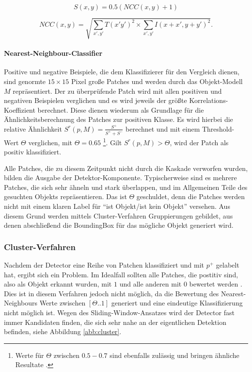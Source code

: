 	\begin{equation}
	S(x,y)=0.5(NCC(x,y)+1)
	\end{equation}

	\begin{equation}
	NCC(x,y)=\sqrt{\underset{x',y'}{\sum}T(x'y')^{2}\times\underset{x',y'}{\sum}I(x+x',y+y')^{2}}.
	\end{equation}

	\paragraph{Nearest-Neighbour-Classifier}
	Positive und negative Beispiele, die dem Klassifizierer für den Vergleich dienen, sind genormte $15\times15$ Pixel große Patches und werden	durch das Objekt-Modell $M$ repräsentiert. Der zu überprüfende Patch wird mit allen positiven und negativen Beispielen verglichen und es wird jeweils der größte Korrelations-Koeffizient berechnet. Diese dienen wiederum als Grundlage für die Ähnlichkeitsberechnung des Patches zur positiven Klasse. Es wird hierbei die relative Ähnlichkeit $S^{r}(p,M)=\frac{S^{+}}{S^{+}+S^{-}}$	berechnet und mit einem Threshold-Wert $\Theta$ verglichen, mit $\Theta=0.65$	\footnote{Werte für $\Theta$ zwischen $0.5-0.7$ sind ebenfalls zulässig und	bringen ähnliche Resultate \cite{TLD}. }. Gilt $S^{r}(p,M)>\Theta$, wird der Patch als positiv klassifiziert.

	Alle Patches, die zu diesem Zeitpunkt nicht durch die Kaskade verworfen wurden, bilden die Ausgabe der Detektor-Komponente. Typischerweise sind es mehrere Patches, die sich sehr ähneln und stark überlappen, und im Allgemeinen Teile des gesuchten Objekts repräsentieren. Das ist $\Theta$ geschuldet, denn die Patches werden nicht mit einem klaren Label für ``ist Objekt/ist kein Objekt'' versehen. Aus diesem Grund werden mittels Cluster-Verfahren Gruppierungen gebildet, aus denen abschließend die BoundingBox für das mögliche Objekt generiert wird. 


	\subsubsection{Cluster-Verfahren}
	Nachdem der Detector eine Reihe von Patchen klassifiziert und mit	$p^{+}$ gelabelt hat, ergibt sich ein Problem. Im Idealfall sollten	alle Patches, die postitiv sind, also als Objekt erkannt wurden, mit $1$ und alle anderen mit $0$ bewertet werden \cite{BAB}. Dies ist in diesem Verfahren jedoch nicht möglich, da die Bewertung des Nearest-Neighbours	Werte zwischen $[\Theta..1]$ generiert und eine eindeutige Klassifizierung nicht möglich ist. Wegen des Sliding-Window-Ansatzes wird der Detector	fast immer Kandidaten finden, die sich sehr nahe an der eigentlichen Detektion befinden, siehe Abbildung \ref{abb:cluster}.

